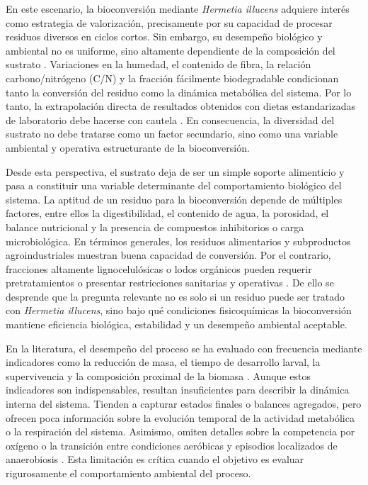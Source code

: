 En este escenario, la bioconversión mediante \textit{Hermetia illucens} adquiere interés como estrategia de valorización, precisamente por su capacidad de procesar residuos diversos en ciclos cortos. Sin embargo, su desempeño biológico y ambiental no es uniforme, sino altamente dependiente de la composición del sustrato \parencite{nayakHermetiaIllucensDiptera2023,elsayedConversionProteinrichWaste2024a,brunoValorizationOrganicWaste2025}. Variaciones en la humedad, el contenido de fibra, la relación carbono/nitrógeno (C/N) y la fracción fácilmente biodegradable condicionan tanto la conversión del residuo como la dinámica metabólica del sistema. Por lo tanto, la extrapolación directa de resultados obtenidos con dietas estandarizadas de laboratorio debe hacerse con cautela \parencite{elsayedConversionProteinrichWaste2024a,brunoValorizationOrganicWaste2025,rossiEstimatingDynamicsGreenhouse2024a}. En consecuencia, la diversidad del sustrato no debe tratarse como un factor secundario, sino como una variable ambiental y operativa estructurante de la bioconversión.

Desde esta perspectiva, el sustrato deja de ser un simple soporte alimenticio y pasa a constituir una variable determinante del comportamiento biológico del sistema. La aptitud de un residuo para la bioconversión depende de múltiples factores, entre ellos la digestibilidad, el contenido de agua, la porosidad, el balance nutricional y la presencia de compuestos inhibitorios o carga microbiológica. En términos generales, los residuos alimentarios y subproductos agroindustriales muestran buena capacidad de conversión. Por el contrario, fracciones altamente lignocelulósicas o lodos orgánicos pueden requerir pretratamientos o presentar restricciones sanitarias y operativas \parencite{elsayedConversionProteinrichWaste2024a,brunoValorizationOrganicWaste2025,nasereldeenBioconversionDifferentWaste2023}. De ello se desprende que la pregunta relevante no es solo si un residuo puede ser tratado con \textit{Hermetia illucens}, sino bajo qué condiciones fisicoquímicas la bioconversión mantiene eficiencia biológica, estabilidad y un desempeño ambiental aceptable.

En la literatura, el desempeño del proceso se ha evaluado con frecuencia mediante indicadores como la reducción de masa, el tiempo de desarrollo larval, la supervivencia y la composición proximal de la biomasa \parencite{surendraBioconversionOrganicWastes2016,singhInclusiveApproachOrganic2019a,bermudez-serranoComprehensiveUtilizationBlack2023,amrulReviewOrganicWaste2022}. Aunque estos indicadores son indispensables, resultan insuficientes para describir la dinámica interna del sistema. Tienden a capturar estados finales o balances agregados, pero ofrecen poca información sobre la evolución temporal de la actividad metabólica o la respiración del sistema. Asimismo, omiten detalles sobre la competencia por oxígeno o la transición entre condiciones aeróbicas y episodios localizados de anaerobiosis \parencite{rossiEstimatingDynamicsGreenhouse2024a,boakye-yiadomGreenhouseGasEmissions2022,eriksenDynamicModellingFeed2022}. Esta limitación es crítica cuando el objetivo es evaluar rigurosamente el comportamiento ambiental del proceso.

